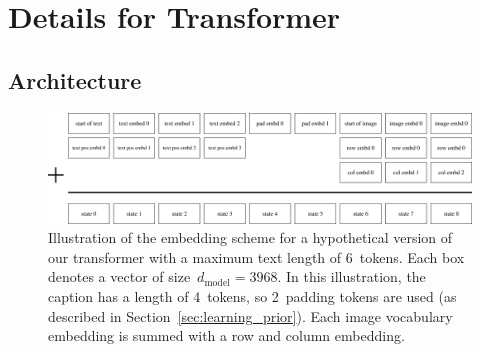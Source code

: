 \documentclass{article}
\begin{document}
\section{Details for Transformer}

\subsection{Architecture}
\label{sec:xf_arch}
%
\begin{figure}[t]
    \centering
    \includegraphics[width=\textwidth]{xf_embds.png}
    \caption{Illustration of the embedding scheme for a hypothetical version of our transformer with a maximum text length of 6~tokens. Each box denotes a vector of size~$d_\mathrm{model} = 3968$. In this illustration, the caption has a length of 4~tokens, so 2~padding tokens are used (as described in Section~\ref{sec:learning_prior}). Each image vocabulary embedding is summed with a row and column embedding.}
    \label{fig:xf_embds}
\end{figure}
%
\end{document}
